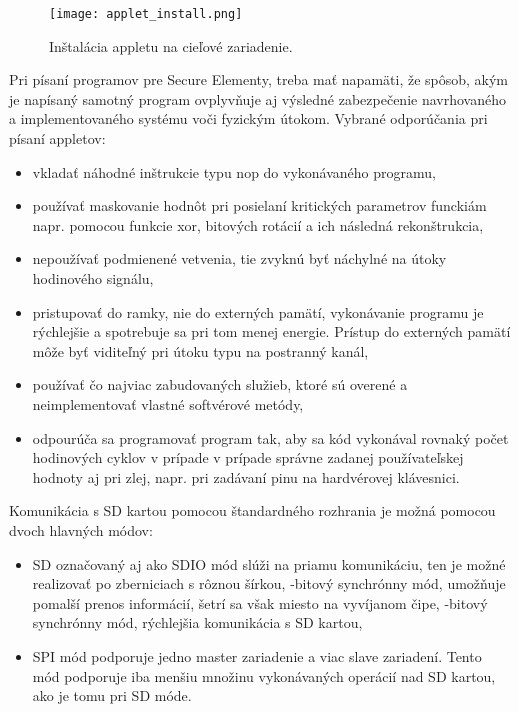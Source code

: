 \documentclass[12pt,a4wide,oneside,openright]{report}
\begin{document}
\begin{figure*}[h]
	\centering
	\texttt{[image: applet\_install.png]}
	\caption{Inštalácia appletu na cieľové zariadenie. \cite{javacardinstruction}}
	\label{f:applet_install}
\end{figure*}


Pri písaní programov pre Secure Elementy, treba mať napamäti, že spôsob, akým je napísaný samotný program ovplyvňuje aj výsledné zabezpečenie navrhovaného a implementovaného systému voči fyzickým útokom.
Vybrané odporúčania pri písaní appletov:
\begin{itemize}
	\item vkladať náhodné inštrukcie typu nop do vykonávaného programu,
	\item používať maskovanie hodnôt pri posielaní kritických parametrov funckiám napr. pomocou funkcie xor, bitových rotácií a ich následná rekonštrukcia,
	\item nepoužívať podmienené vetvenia, tie zvyknú byť náchylné na útoky hodinového signálu,
	\item pristupovať do ramky, nie do externých pamätí, vykonávanie programu je rýchlejšie a spotrebuje sa pri tom menej energie. Prístup do externých pamätí môže byť viditeľný pri útoku typu na postranný kanál,
	\item používať čo najviac zabudovaných služieb, ktoré sú overené a neimplementovať vlastné softvérové metódy,
	\item odpourúča sa programovať program tak, aby sa kód vykonával rovnaký počet hodinových cyklov v prípade v prípade správne zadanej používateľskej hodnoty aj pri zlej, napr. pri zadávaní pinu na hardvérovej klávesnici.
\end{itemize}
\onehalfspacing

Komunikácia s SD kartou pomocou štandardného rozhrania je možná pomocou dvoch hlavných módov\cite{sdio}:
\singlespacing
\begin{itemize}
	\item SD označovaný aj ako SDIO mód slúži na priamu komunikáciu, ten je možné realizovať po zberniciach s rôznou šírkou,
	-bitový synchrónny mód, umožňuje pomalší prenos informácií, šetrí sa však miesto na vyvíjanom čipe,
	-bitový synchrónny mód, rýchlejšia komunikácia s SD kartou,
	\item SPI mód podporuje jedno master zariadenie a viac slave zariadení. Tento mód podporuje iba menšiu množinu vykonávaných operácií nad SD kartou, ako je tomu pri SD móde.
\end{itemize}
\onehalfspacing
\end{document}
